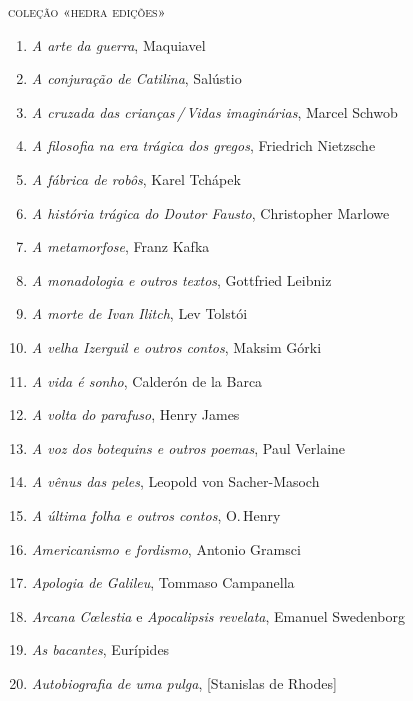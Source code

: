 \pagebreak
\blankAteven
\pagestyle{empty}
\begingroup
\rmfamily
\fontsize{7}{8}\selectfont

\color{black}


{\large\textsc{coleção «hedra edições»}}


\makeatletter
\renewcommand{\labelenumi}{}
\renewcommand{\labelenumii}{}
\renewcommand{\labelenumiii}{}
\makeatother

\begin{enumerate}
\setlength{\topsep}{2pt}
\setlength{\partopsep}{0pt}
\setlength\parskip{4.2pt}
\setlength\itemsep{-1.4mm}
\item \textit{A arte da guerra}, Maquiavel
\item \textit{A conjuração de Catilina}, Salústio
\item \textit{A cruzada das crianças\,/\,Vidas imaginárias}, Marcel Schwob
\item \textit{A filosofia na era trágica dos gregos}, Friedrich Nietzsche
\item \textit{A fábrica de robôs}, Karel Tchápek 
\item \textit{A história trágica do Doutor Fausto}, Christopher Marlowe
\item \textit{A metamorfose}, Franz Kafka
\item \textit{A monadologia e outros textos}, Gottfried Leibniz
\item \textit{A morte de Ivan Ilitch}, Lev Tolstói 
\item \textit{A velha Izerguil e outros contos}, Maksim Górki
\item \textit{A vida é sonho}, Calderón de la Barca
\item \textit{A volta do parafuso}, Henry James
\item \textit{A voz dos botequins e outros poemas}, Paul Verlaine 
\item \textit{A vênus das peles}, Leopold von Sacher{}-Masoch
\item \textit{A última folha e outros contos}, O.\,Henry
\item \textit{Americanismo e fordismo}, Antonio Gramsci
\item \textit{Apologia de Galileu}, Tommaso Campanella 
\item \textit{Arcana C\oe lestia} e \textit{Apocalipsis revelata}, Emanuel Swedenborg
\item \textit{As bacantes}, Eurípides
\item \textit{Autobiografia de uma pulga}, [Stanislas de Rhodes]

\end{enumerate}
